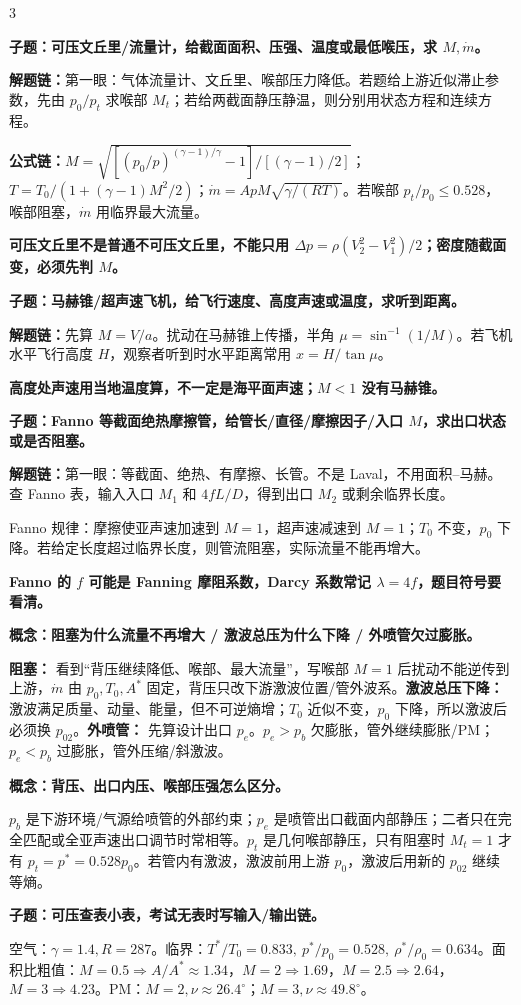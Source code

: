 \documentclass[a4paper]{article}
\newcommand{\qt}[1]{\vspace{0.25pt}\colorbox{Q}{\parbox{\dimexpr\linewidth-2\fboxsep}{\color{white}\bfseries #1}}\par}
\newcommand{\ans}[1]{\colorbox{G}{\parbox{\dimexpr\linewidth-2\fboxsep}{#1}}\par}
\newcommand{\warn}[1]{\colorbox{Y}{\parbox{\dimexpr\linewidth-2\fboxsep}{\color{E}\bfseries #1}}\par}
\newcommand{\chain}[1]{{\color{A}\bfseries 解题链：}#1\par}
\newcommand{\form}[1]{{\color{M}\bfseries 公式链：}#1\par}
\begin{document}
\begin{multicols}{3}
\qt{子题：可压文丘里/流量计，给截面面积、压强、温度或最低喉压，求 $M,\dot m$。}
\chain{第一眼：气体流量计、文丘里、喉部压力降低。若题给上游近似滞止参数，先由 $p_0/p_t$ 求喉部 $M_t$；若给两截面静压静温，则分别用状态方程和连续方程。}
\form{$M=\sqrt{[(p_0/p)^{(\gamma-1)/\gamma}-1]/[(\gamma-1)/2]}$；$T=T_0/(1+(\gamma-1)M^2/2)$；$\dot m=ApM\sqrt{\gamma/(RT)}$。若喉部 $p_t/p_0\le0.528$，喉部阻塞，$\dot m$ 用临界最大流量。}
\warn{可压文丘里不是普通不可压文丘里，不能只用 $\Delta p=\rho(V_2^2-V_1^2)/2$；密度随截面变，必须先判 $M$。}

\qt{子题：马赫锥/超声速飞机，给飞行速度、高度声速或温度，求听到距离。}
\chain{先算 $M=V/a$。扰动在马赫锥上传播，半角 $\mu=\sin^{-1}(1/M)$。若飞机水平飞行高度 $H$，观察者听到时水平距离常用 $x=H/\tan\mu$。}
\warn{高度处声速用当地温度算，不一定是海平面声速；$M<1$ 没有马赫锥。}

\qt{子题：Fanno 等截面绝热摩擦管，给管长/直径/摩擦因子/入口 $M$，求出口状态或是否阻塞。}
\chain{第一眼：等截面、绝热、有摩擦、长管。不是 Laval，不用面积--马赫。查 Fanno 表，输入入口 $M_1$ 和 $4fL/D$，得到出口 $M_2$ 或剩余临界长度。}
\ans{Fanno 规律：摩擦使亚声速加速到 $M=1$，超声速减速到 $M=1$；$T_0$ 不变，$p_0$ 下降。若给定长度超过临界长度，则管流阻塞，实际流量不能再增大。}
\warn{Fanno 的 $f$ 可能是 Fanning 摩阻系数，Darcy 系数常记 $\lambda=4f$，题目符号要看清。}

\qt{概念：阻塞为什么流量不再增大 / 激波总压为什么下降 / 外喷管欠过膨胀。}
\ans{\textbf{阻塞：} 看到“背压继续降低、喉部、最大流量”，写喉部 $M=1$ 后扰动不能逆传到上游，$\dot m$ 由 $p_0,T_0,A^*$ 固定，背压只改下游激波位置/管外波系。\textbf{激波总压下降：} 激波满足质量、动量、能量，但不可逆熵增；$T_0$ 近似不变，$p_0$ 下降，所以激波后必须换 $p_{02}$。\textbf{外喷管：} 先算设计出口 $p_e$。$p_e>p_b$ 欠膨胀，管外继续膨胀/PM；$p_e<p_b$ 过膨胀，管外压缩/斜激波。}
\qt{概念：背压、出口内压、喉部压强怎么区分。}
\ans{$p_b$ 是下游环境/气源给喷管的外部约束；$p_e$ 是喷管出口截面内部静压；二者只在完全匹配或全亚声速出口调节时常相等。$p_t$ 是几何喉部静压，只有阻塞时 $M_t=1$ 才有 $p_t=p^*=0.528p_0$。若管内有激波，激波前用上游 $p_0$，激波后用新的 $p_{02}$ 继续等熵。}

\qt{子题：可压查表小表，考试无表时写输入/输出链。}
\ans{空气：$\gamma=1.4,R=287$。临界：$T^*/T_0=0.833,\ p^*/p_0=0.528,\ \rho^*/\rho_0=0.634$。面积比粗值：$M=0.5\Rightarrow A/A^*\approx1.34$，$M=2\Rightarrow1.69$，$M=2.5\Rightarrow2.64$，$M=3\Rightarrow4.23$。PM：$M=2,\nu\approx26.4^\circ$；$M=3,\nu\approx49.8^\circ$。}



\end{multicols}
\end{document}
